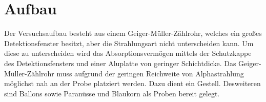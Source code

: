 \section{Aufbau}
\label{sec:Aufbau}

Der Versuchsaufbau besteht aus einem Geiger-Müller-Zählrohr, welches ein großes 
Detektionsfenster besitzt, aber die Strahlungsart nicht unterscheiden kann. 
Um diese zu unterscheiden wird das Absorptionsvermögen mittels der Schutzkappe des 
Detektionsfensters und einer Aluplatte von geringer Schichtdicke. Das Geiger-Müller-Zählrohr 
muss aufgrund der geringen Reichweite von Alphastrahlung möglichst nah an der Probe platziert werden.
Dazu dient ein Gestell. Desweiteren sind Ballons sowie Paranüsse und Blaukorn als Proben bereit gelegt.